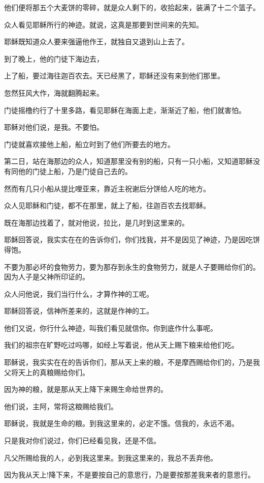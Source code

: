 \documentclass[12pt,oneside]{book}
\begin{document}
他们便将那五个大麦饼的零碎，就是众人剩下的，收拾起来，装满了十二个篮子。

众人看见耶稣所行的神迹。就说，这真是那要到世间来的先知。

耶稣既知道众人要来强逼他作王，就独自又退到山上去了。

到了晚上，他的门徒下海边去，

上了船，要过海往迦百农去。天已经黑了，耶稣还没有来到他们那里。

忽然狂风大作，海就翻腾起来。

门徒摇橹约行了十里多路，看见耶稣在海面上走，渐渐近了船，他们就害怕。

耶稣对他们说，是我。不要怕。

门徒就喜欢接他上船，船立时到了他们所要去的地方。

第二日，站在海那边的众人，知道那里没有别的船，只有一只小船，又知道耶稣没有同他的门徒上船，乃是门徒自己去的。

然而有几只小船从提比哩亚来，靠近主祝谢后分饼给人吃的地方。

众人见耶稣和门徒，都不在那里，就上了船，往迦百农去找耶稣。

既在海那边找着了，就对他说，拉比，是几时到这里来的。

耶稣回答说，我实实在在的告诉你们，你们找我，并不是因见了神迹，乃是因吃饼得饱。

不要为那必坏的食物劳力，要为那存到永生的食物劳力，就是人子要赐给你们的。因为人子是父神所印证的。

众人问他说，我们当行什么，才算作神的工呢。

耶稣回答说，信神所差来的，这就是作神的工。

他们又说，你行什么神迹，叫我们看见就信你。你到底作什么事呢。

我们的祖宗在旷野吃过吗哪，如经上写着说，他从天上赐下粮来给他们吃。

耶稣说，我实实在在的告诉你们，那从天上来的粮，不是摩西赐给你们的，乃是我父将天上的真粮赐给你们。

因为神的粮，就是那从天上降下来赐生命给世界的。

他们说，主阿，常将这粮赐给我们。

耶稣说，我就是生命的粮。到我这里来的，必定不饿。信我的，永远不渴。

只是我对你们说过，你们已经看见我，还是不信。

凡父所赐给我的人，必到我这里来。到我这里来的，我总不丢弃他。

因为我从天上!降下来，不是要按自己的意思行，乃是要按那差我来者的意思行。
\end{document}
